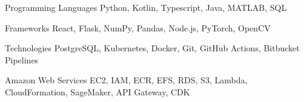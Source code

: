 
\begin{cvskills}
  \cvskill 
    {Programming Languages}
    {Python, Kotlin, Typescript, Java, MATLAB, SQL}

  \cvskill
    {Frameworks}
    {React, Flask, NumPy, Pandas, Node.js, PyTorch, OpenCV}

    \cvskill 
    {Technologies}
    {PostgreSQL, Kubernetes, Docker, Git, GitHub Actions, Bitbucket Pipelines}


    \cvskill 
    {Amazon Web Services}
    {EC2, IAM, ECR, EFS, RDS, S3, Lambda, CloudFormation, SageMaker, API Gateway, CDK}


\end{cvskills}
